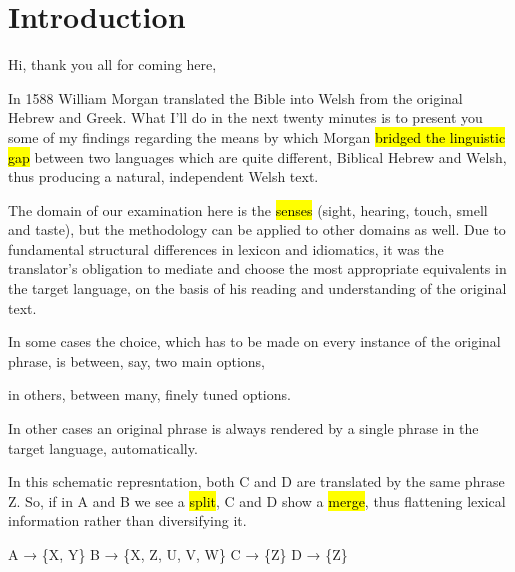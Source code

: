 \section{Introduction}

\begin{paper}
	{\click} Hi, thank you all for coming here,

	{\click} In 1588 William Morgan translated the Bible into Welsh from the original Hebrew and Greek. What I’ll do in the next twenty minutes is to present you some of my findings regarding the means by which Morgan \hl{bridged the linguistic gap} between two languages which are quite different, Biblical Hebrew and Welsh, thus producing a natural, independent Welsh text.

	The domain of our examination here is the \hl{senses} (sight, hearing, touch, smell and taste), but the methodology can be applied to other domains as well. Due to fundamental structural differences in lexicon and idiomatics, it was the translator’s obligation to mediate and choose the most appropriate equivalents in the target language, on the basis of his reading and understanding of the original text.

	\begin{compactitem}
		\item {\click} In some cases the choice, which has to be made on every instance of the original phrase, is between, say,  two main options,
		\item in others, between  many, finely tuned options.
		\item {} In other cases an original phrase is always rendered by a single phrase in the target language, automatically.
	\end{compactitem}

	In this schematic represntation, both C and D are translated by the same phrase Z. So, if in A and B we see a \hl{split}, C and D show a \hl{merge}, thus flattening lexical information rather than diversifying it.
\end{paper}

\begin{hopoint}
	A → \{X, Y\}\hfill
	B → \{X, Z, U, V, W\}\hfill
	C → \{Z\}\hfill
	D → \{Z\}
\end{hopoint}

